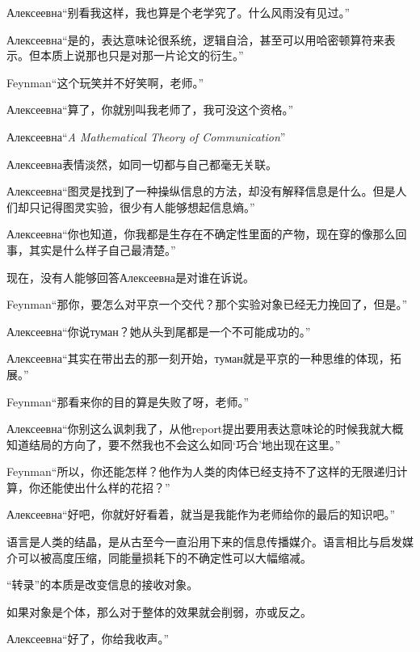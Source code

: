 \documentclass{article}
\begin{document}
Алексеевна“别看我这样，我也算是个老学究了。什么风雨没有见过。”

Алексеевна“是的，表达意味论很系统，逻辑自洽，甚至可以用哈密顿算符来表示。但本质上说那也只是对那一片论文的衍生。”

Feynman“这个玩笑并不好笑啊，老师。”

Алексеевна“算了，你就别叫我老师了，我可没这个资格。”

Алексеевна“\textit{A Mathematical Theory of Communication}”

Алексеевна表情淡然，如同一切都与自己都毫无关联。

Алексеевна“图灵是找到了一种操纵信息的方法，却没有解释信息是什么。但是人们却只记得图灵实验，很少有人能够想起信息熵。”

Алексеевна“你也知道，你我都是生存在不确定性里面的产物，现在穿的像那么回事，其实是什么样子自己最清楚。”

现在，没有人能够回答Алексеевна是对谁在诉说。

Feynman“那你，要怎么对平京一个交代？那个实验对象已经无力挽回了，但是。”

Алексеевна“你说туман？她从头到尾都是一个不可能成功的。”

Алексеевна“其实在带出去的那一刻开始，туман就是平京的一种思维的体现，拓展。”

Feynman“那看来你的目的算是失败了呀，老师。”

Алексеевна“你别这么讽刺我了，从他report提出要用表达意味论的时候我就大概知道结局的方向了，要不然我也不会这么如同‘巧合’地出现在这里。”

Feynman“所以，你还能怎样？他作为人类的肉体已经支持不了这样的无限递归计算，你还能使出什么样的花招？”

Алексеевна“好吧，你就好好看着，就当是我能作为老师给你的最后的知识吧。”

语言是人类的结晶，是从古至今一直沿用下来的信息传播媒介。语言相比与启发媒介可以被高度压缩，同能量损耗下的不确定性可以大幅缩减。

“转录”的本质是改变信息的接收对象。

如果对象是个体，那么对于整体的效果就会削弱，亦或反之。

Алексеевна“好了，你给我收声。”








\end{document}
